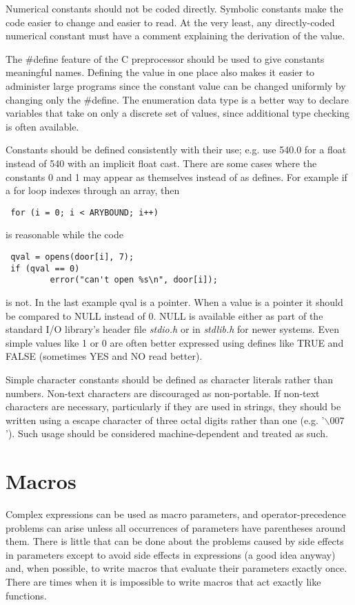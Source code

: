 Numerical constants should not be coded directly. Symbolic constants make the
code easier to change and easier to read. At the very least, any directly-coded
numerical constant must have a comment explaining the derivation of the value. 

 The \#define feature of the C preprocessor should be used to give constants
meaningful names. Defining the value in one place also makes it easier to
administer large programs since the constant value can be changed uniformly by
changing only the \#define. The enumeration data type is a better way to declare
variables that take on only a discrete set of values, since additional type
checking is often available. 

 Constants should be defined consistently with their use; e.g. use 540.0 for a
float instead of 540 with an implicit float cast. There are some cases where
the constants 0 and 1 may appear as themselves instead of as defines. For
example if a for loop indexes through an array, then 
\begin{verbatim}
 for (i = 0; i < ARYBOUND; i++) 
\end{verbatim}
is reasonable while the code 
\begin{verbatim}
 qval = opens(door[i], 7);
 if (qval == 0)
         error("can't open %s\n", door[i]);
\end{verbatim}
is not. In the last example qval is a pointer. When a value is a
pointer it should be compared to NULL instead of 0. NULL is available
either as part of the standard I/O library's header file {\em stdio.h}
or in {\em stdlib.h} for newer systems. Even simple values like 1 or 0
are often better expressed using defines like TRUE and FALSE
(sometimes YES and NO read better). 

 Simple character constants should be defined as character literals rather than
numbers. Non-text characters are discouraged as non-portable. If non-text
characters are necessary, particularly if they are used in strings, they
should be written using a escape character of three octal digits rather than
one (e.g. '$\backslash 007$'). Such usage should be considered machine-dependent
and treated as such.
\newpage
\section{Macros}

 Complex expressions can be used as macro parameters, and operator-precedence
problems can arise unless all occurrences of parameters have parentheses around
them. There is little that can be done about the problems caused by side
effects in parameters except to avoid side effects in expressions (a good idea
anyway) and, when possible, to write macros that evaluate their parameters
exactly once. There are times when it is impossible to write macros that act
exactly like functions. 

